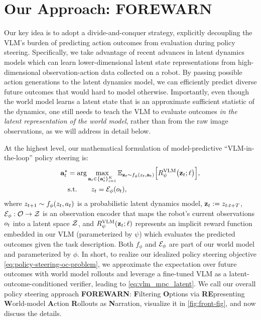 
\section{Our Approach: FOREWARN}
\label{sec:method}
Our key idea is to adopt a divide-and-conquer strategy, explicitly decoupling the VLM's burden of predicting action outcomes from evaluation during policy steering. 
Specifically, we take advantage of recent advances in latent dynamics models \citep{liumulti,wu2023daydreamer} which can learn lower-dimensional latent state representations from high-dimensional observation-action data collected on a robot. 
By passing possible action generations to the latent dynamics model, we can efficiently predict diverse future outcomes that would hard to model otherwise. 
Importantly, even though the world model learns a latent state that is an approximate sufficient statistic of the dynamics, one still needs to teach the VLM to evaluate outcomes \textit{in the latent representation of the world model}, rather than from the raw image observations, as we will address in detail below.

At the highest level, our mathematical formulation of model-predictive ``VLM-in-the-loop'' policy steering is: 
\begin{equation}
    \begin{aligned}
    \mathbf{a}^{\star}_t &= \arg\max_{\mathbf{a}_t \in \{\mathbf{a}^i_t\}^K_{i=1}} \mathbb{E}_{\mathbf{z}_t \sim f_\phi(z_t, \mathbf{a}_t)} \Big[R^{\text{VLM}}_\psi\big(\mathbf{z}_t; \ell \big) \Big], \\ 
    & \text{s.t.} \quad\quad z_t = \mathcal{E}_\phi(o_t),\\ 
\end{aligned}
\label{eq:vlm_mpc_latent}
\end{equation}
where $z_{t+1} \sim f_\phi(z_t, a_t)$ is a probabilistic latent dynamics model, $\mathbf{z}_{t}:=z_{t:t+T}$, $\mathcal{E}_\phi: \mathcal{O} \rightarrow \mathcal{Z}$ is an observation encoder that maps the robot’s current observations $o_t$ into a latent space $\mathcal{Z}$, and $R^
{\text{VLM}}_\psi(\mathbf{z}_t; \ell)$ represents an implicit reward function embedded in our %
VLM (parameterized by $\psi$) which evaluates the predicted outcomes given the task description. Both $f_\phi$ and $\mathcal{E}_\phi$ are part of our world model and parameterized by $\phi$. In short, to realize our idealized policy steering objective \eqref{eq:policy-steering-oc-problem}, we approximate the expectation over future outcomes with world model rollouts and leverage a fine-tuned VLM as a latent-outcome-conditioned verifier, leading to \eqref{eq:vlm_mpc_latent}.
We call our overall policy steering approach \textbf{FOREWARN}: \textbf{F}iltering \textbf{O}ptions via \textbf{RE}presenting \textbf{W}orld-model \textbf{A}ction \textbf{R}ollouts as \textbf{N}arration, visualize it in \autoref{fig:front-fig}, and now discuss the details.















